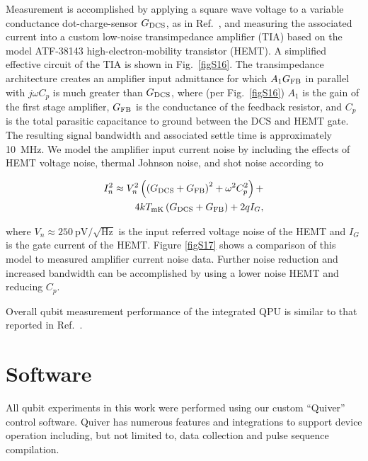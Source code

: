 \documentclass[aps,prl,twocolumn,superscriptaddress,nobibnotes,10pt,floatfix]{revtex4-2}
\newcommand{\figref}[1]{Fig.~\ref{#1}}
\newcommand{\ts}[2]{{#1}_{\textnormal{#2}}}
\begin{document}
Measurement is accomplished by applying a square wave voltage to a variable conductance dot-charge-sensor \(\ts{G}{DCS}\), as in Ref.~\cite{s_blumoff_fast_2022}, and measuring the associated current into a custom low-noise transimpedance amplifier (TIA) based on the model ATF-38143 high-electron-mobility transistor (HEMT).
A simplified effective circuit of the TIA is shown in \figref{figS16}.
The transimpedance architecture creates an amplifier input admittance for which $A_{1}\ts{G}{FB}$ in parallel with $j\omega C_{p}$ is much greater than $\ts{G}{DCS}$, where (per \figref{figS16}) $A_1$ is the gain of the first stage amplifier, $\ts{G}{FB}$ is the conductance of the feedback resistor, and \(C_{p}\) is the total parasitic capacitance to ground between the DCS and HEMT gate.   The resulting signal bandwidth and associated settle time is approximately 10~MHz.
We model the amplifier input current noise by including the effects of HEMT voltage noise, thermal Johnson noise, and shot noise according to

\begin{equation}\begin{split}
I_{n}^{2} \approx V_{n}^{2}\left( \left( \ts{G}{DCS} + \ts{G}{FB} \right)^{2} + \omega^{2}C_{p}^{2} \right) + \\ 4k\ts{T}{mK}\left( \ts{G}{DCS} + \ts{G}{FB} \right) + 2qI_{G},
\end{split}\end{equation}

where \(V_{n} \approx 250~\text{pV}/\sqrt{\text{Hz}}\) is the input referred voltage noise of the HEMT and \(I_{G}\) is the gate current of the HEMT.
Figure \ref{figS17} shows a comparison of this model to measured amplifier current noise data.
Further noise reduction and increased bandwidth can be accomplished by using a lower noise HEMT and reducing \(C_{p}\).



Overall qubit measurement performance of the integrated QPU is similar to that reported in Ref.~\cite{s_blumoff_fast_2022}.

\section{Software}\label{software}

All qubit experiments in this work were performed using our custom ``Quiver'' control software.
Quiver has numerous features and integrations to support device operation including, but not limited to, data collection and pulse sequence compilation.
\end{document}
